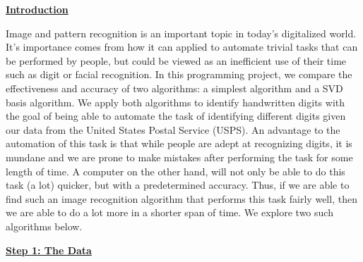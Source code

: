 \documentclass[final,12pt,reqno]{amsart}
\begin{document}
\thispagestyle{fancy}

\underline{\textbf{Introduction}}

Image and pattern recognition is an important topic in today's digitalized world. It's importance comes from how it can applied to automate trivial tasks that can be performed by people, but could be viewed as an inefficient use of their time such as digit or facial recognition. In this programming project, we compare the effectiveness and accuracy of two algorithms: a simplest algorithm and a SVD basis algorithm. We apply both algorithms to identify handwritten digits with the goal of being able to automate the task of identifying different digits given our data from the United States Postal Service (USPS). An advantage to the automation of this task is that while people are adept at recognizing digits, it is mundane and we are prone to make mistakes after performing the task for some length of time. A computer on the other hand, will not only be able to do this task (a lot) quicker, but with a predetermined accuracy. Thus, if we are able to find such an image recognition algorithm that performs this task fairly well, then we are able to do a lot more in a shorter span of time. We explore two such algorithms below.

\newpage

\underline{\textbf{Step 1: The Data}}
\end{document}
